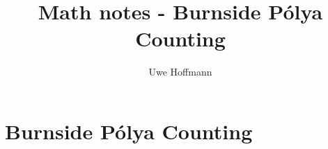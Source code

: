 

\title{Math notes - Burnside P\'{o}lya Counting}
\author{Uwe Hoffmann}



\setcounter{chapter}{1}
\chapter*{Burnside P\'{o}lya Counting}
